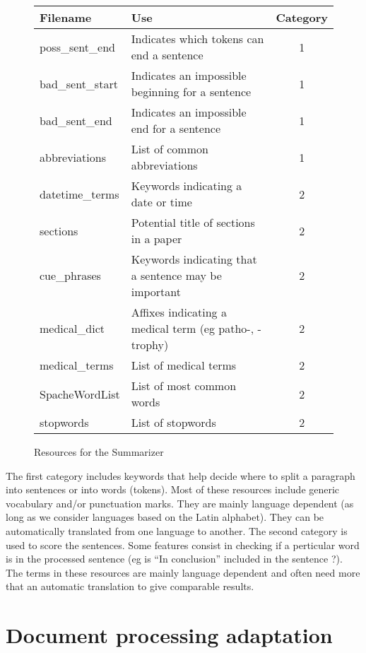 \documentclass[a4paper,10pt]{article}
\begin{document}
\begin{figure}[H]
  \centering
  \begin{tabular}[h]{|l|l|c|}
    \hline
    Filename & Use & Category \\
    \hline
    poss\_sent\_end & Indicates which tokens can end a sentence & 1\\
    bad\_sent\_start & Indicates an impossible beginning for a
    sentence & 1\\
    bad\_sent\_end & Indicates an impossible end for a sentence & 1\\
    abbreviations & List of common abbreviations & 1\\
    \hline
    datetime\_terms & Keywords indicating a date or time & 2\\
    sections & Potential title of sections in a paper & 2\\
    cue\_phrases & Keywords indicating that a sentence may be
    important & 2\\
    medical\_dict & Affixes indicating a medical term (eg patho-,
    -trophy) & 2\\
    medical\_terms & List of medical terms & 2\\
    SpacheWordList & List of most common words & 2\\
    stopwords & List of stopwords & 2\\
    \hline
    
  \end{tabular}
  \caption{Resources for the Summarizer}
  \label{fig:enresources}
\end{figure}

The first category includes keywords that help decide where to split
a paragraph into sentences or into words (tokens). Most of these
resources include generic vocabulary and/or punctuation marks. They
are mainly language dependent (as long as we consider languages based
on the Latin alphabet). They can be automatically translated from one
language to another.
The second category is used to score the sentences. Some features
consist in checking if a perticular word is in the processed sentence
(eg is ``In conclusion'' included in the sentence ?). The terms in
these resources are mainly language dependent and often need more that
an automatic translation to give comparable results.


\section{Document processing adaptation}
\label{sec:docproc}
\end{document}

